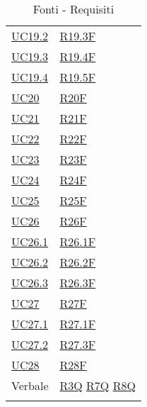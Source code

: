 \begin{center}
\begin{longtable}[!h]{m{50px} m{50px}}
        \hyperref[sec:UC19.2]{UC19.2}     & \hyperref[tab:RequisitiFunzionali]{R19.3F} \\
        \hyperref[sec:UC19.3]{UC19.3}     & \hyperref[tab:RequisitiFunzionali]{R19.4F} \\
        \hyperref[sec:UC19.4]{UC19.4}     & \hyperref[tab:RequisitiFunzionali]{R19.5F} \\
        \hyperref[sec:UC20]{UC20}         & \hyperref[tab:RequisitiFunzionali]{R20F}   \\
        \hyperref[sec:UC21]{UC21}         & \hyperref[tab:RequisitiFunzionali]{R21F}   \\
        \hyperref[sec:UC22]{UC22}         & \hyperref[tab:RequisitiFunzionali]{R22F}   \\
        \hyperref[sec:UC23]{UC23}         & \hyperref[tab:RequisitiFunzionali]{R23F}   \\
        \hyperref[sec:UC24]{UC24}         & \hyperref[tab:RequisitiFunzionali]{R24F}   \\
        \hyperref[sec:UC25]{UC25}         & \hyperref[tab:RequisitiFunzionali]{R25F}   \\
        \hyperref[sec:UC26]{UC26}         & \hyperref[tab:RequisitiFunzionali]{R26F}   \\
        \hyperref[sec:UC26.1]{UC26.1}     & \hyperref[tab:RequisitiFunzionali]{R26.1F} \\
        \hyperref[sec:UC26.2]{UC26.2}     & \hyperref[tab:RequisitiFunzionali]{R26.2F} \\
        \hyperref[sec:UC26.3]{UC26.3}     & \hyperref[tab:RequisitiFunzionali]{R26.3F} \\
        \hyperref[sec:UC27]{UC27}         & \hyperref[tab:RequisitiFunzionali]{R27F}   \\
        \hyperref[sec:UC27.1]{UC27.1}     & \hyperref[tab:RequisitiFunzionali]{R27.1F} \\
        \hyperref[sec:UC27.2]{UC27.2}     & \hyperref[tab:RequisitiFunzionali]{R27.3F} \\
        \hyperref[sec:UC28]{UC28}         & \hyperref[tab:RequisitiFunzionali]{R28F}   \\

        Verbale                           & \hyperref[tab:RequisitiQualita]{R3Q}
        \newline \hyperref[tab:RequisitiQualita]{R7Q} 
        \newline \hyperref[tab:RequisitiQualita]{R8Q}                                   \\



        \rowcolor{white}\caption{Fonti - Requisiti}
    \end{longtable}
\end{center}
